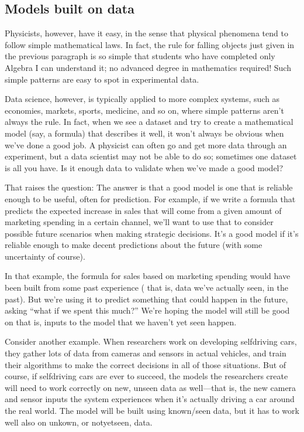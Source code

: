 \documentclass[letterpaper,10pt,english]{jupyterBook}
\begin{document}
\subsection{Models built on data}
\label{\detokenize{chapter-17-machine-learning:models-built-on-data}}
\sphinxAtStartPar
Physicists, however, have it easy, in the sense that physical phenomena tend to follow simple mathematical laws.  In fact, the rule for falling objects just given in the previous paragraph is so simple that students who have completed only Algebra I can understand it; no advanced degree in mathematics required!  Such simple patterns are easy to spot in experimental data.

\sphinxAtStartPar
Data science, however, is typically applied to more complex systems, such as economies, markets, sports, medicine, and so on, where simple patterns aren’t always the rule.  In fact, when we see a dataset and try to create a mathematical model (say, a formula) that describes it well, it won’t always be obvious when we’ve done a good job.  A physicist can often go and get more data through an experiment, but a data scientist may not be able to do so; sometimes one dataset is all you have.  Is it enough data to validate when we’ve made a good model?

\sphinxAtStartPar
That raises the question:    The answer is that a good model is one that is reliable enough to be useful, often for prediction.  For example, if we write a formula that predicts the expected increase in sales that will come from a given amount of marketing spending in a certain channel, we’ll want to use that to consider possible future scenarios when making strategic decisions.  It’s a good model if it’s reliable enough to make decent predictions about the future (with some uncertainty of course).

\sphinxAtStartPar
In that example, the formula for sales based on marketing spending would have been built from some past experience ( that is, data we’ve actually seen, in the past).  But we’re using it to predict something that could happen in the future, asking “what if we spent this much?”  We’re hoping the model will still be good on  that is, inputs to the model that we haven’t yet seen happen.

\sphinxAtStartPar
Consider another example.  When researchers work on developing self\sphinxhyphen{}driving cars, they gather lots of data from cameras and sensors in actual vehicles, and train their algorithms to make the correct decisions in all of those situations.  But of course, if self\sphinxhyphen{}driving cars are ever to succeed, the models the researchers create will need to work correctly on new, unseen data as well—that is, the new camera and sensor inputs the system experiences when it’s actually driving a car around the real world.  The model will be built using known/seen data, but it has to work well also on unkown, or not\sphinxhyphen{}yet\sphinxhyphen{}seen, data.
\end{document}
